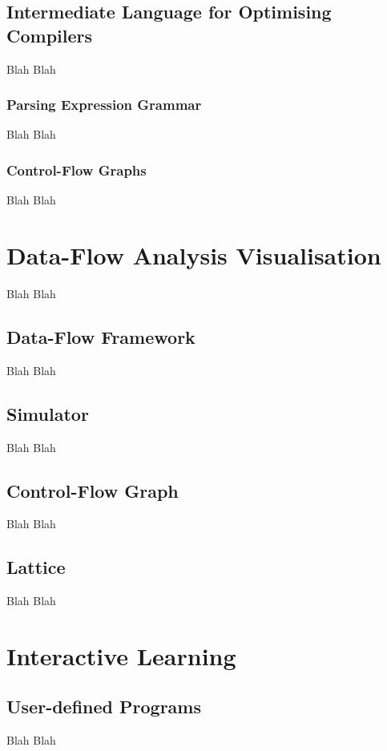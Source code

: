 \documentclass[bsc,twoside,singlespacing,parskip,logo,notimes,normalheadings]{infthesis}
\begin{document}
	\section{Intermediate Language for Optimising Compilers}
	Blah Blah
    
    	\subsection{Parsing Expression Grammar}
	Blah Blah
    
    	\subsection{Control-Flow Graphs}
        Blah Blah


\chapter{Data-Flow Analysis Visualisation}
Blah Blah

    \section{Data-Flow Framework}
    Blah Blah
    
    \section{Simulator}
    Blah Blah
    
    \section{Control-Flow Graph}
    Blah Blah
    
    \section{Lattice}
    Blah Blah
    

\chapter{Interactive Learning}

    \section{User-defined Programs}
    Blah Blah
    
\end{document}
